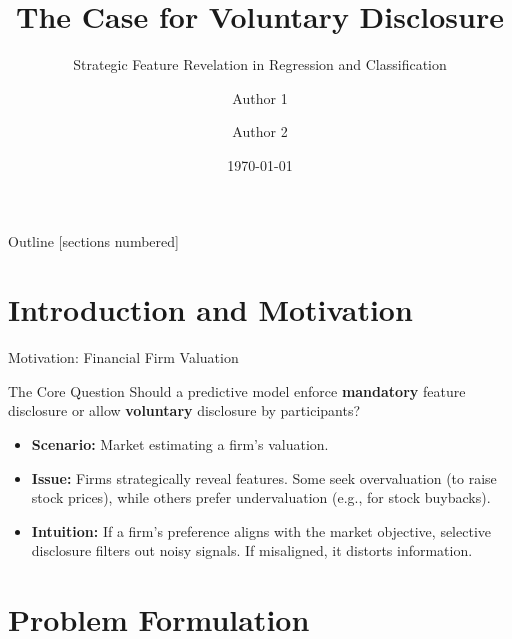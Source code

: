 \documentclass[10pt, aspectratio=169]{beamer}
\title{The Case for Voluntary Disclosure}
\subtitle{Strategic Feature Revelation in Regression and Classification}
\author{Author 1 \and Author 2}
\institute{Google DeepMind}
\date{\today}
\begin{document}
\maketitle

\begin{frame}{Outline}
  [sections numbered]
  \tableofcontents[hideallsubsections]
\end{frame}

\section{Introduction and Motivation}

\begin{frame}{Motivation: Financial Firm Valuation}
  \begin{block}{The Core Question}
    Should a predictive model enforce \textbf{mandatory} feature disclosure or allow \textbf{voluntary} disclosure by participants?
  \end{block}
  \vspace{0.3cm}
  \begin{itemize}
      \item \textbf{Scenario:} Market estimating a firm's valuation.
      \item \textbf{Issue:} Firms strategically reveal features. Some seek overvaluation (to raise stock prices), while others prefer undervaluation (e.g., for stock buybacks).
      \item \textbf{Intuition:} If a firm's preference aligns with the market objective, selective disclosure filters out noisy signals. If misaligned, it distorts information.
  \end{itemize}
\end{frame}

\section{Problem Formulation}
\end{document}
